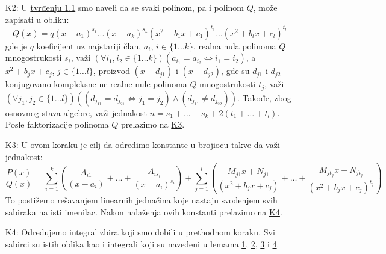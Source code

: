 \documentclass{article}
\begin{document}
\begin{algbox}
\begin{enumerate}[label=\text{K\arabic*}]
        \item[K2:]\label{Algoritam_1_K2}
              U \hyperref[tvrđenje_1.1]{tvrđenju 1.1} smo naveli da se
              svaki polinom, pa i polinom $Q$, može zapisati u obliku:
              $$Q(x) = q(x - a_1)^{s_1}...(x-a_k)^{s_k}(x^2 + b_1x + c_1)^{t_1}...(x^2 + b_lx + c_l)^{t_l}$$
              gde je $q$ koeficijent uz najstariji član,
              $a_i$, $i\in\{1\dotsc k\}$, realna nula polinoma $Q$ mnogostrukosti $s_i$, važi $(\forall i_1,i_2\in\{1\dotsc k\})(a_{i_1}=a_{i_2}\iff i_1=i_2)$,
              a $x^2+b_jx+c_j$, $j\in\{1\dotsc l\}$,
              proizvod $(x-d_{j1})$ i $(x-d_{j2})$,
              gde su $d_{j1}$ i $d_{j2}$ konjugovano kompleksne ne-realne nule polinoma $Q$
              mnogostrukosti $t_j$, važi $(\forall j_1,j_2\in\{1\dotsc l\})((d_{j_11}=d_{j_21}\iff j_1=j_2)\land(d_{j_11}\neq d_{j_22}))$.
              Takođe, zbog \hyperref[OSA]{osnovnog stava algebre}, važi jednakost $n=s_1+\dotsc+s_k+2(t_1+\dotsc+t_l)$.
              Posle faktorizacije polinoma $Q$ prelazimo na \hyperref[Algoritam_1_K3]{K3}.
        \item[K3:]\label{Algoritam_1_K3}
              U ovom koraku je cilj da odredimo konstante u brojiocu takve da važi jednakost:
              $$\frac{P(x)}{Q(x)}=\sum_{i = 1}^k(\frac{A_{i1}}{(x-a_i)}+\dotsc+\frac{A_{is_i}}{(x-a_i)^{s_i}}) + \sum_{j = 1}^l( \frac{M_{j1}x + N_{j1}}{(x^2+b_jx+c_j)}+\dotsc+\frac{M_{jt_j}x + N_{jt_j}}{(x^2 + b_jx + c_j)^{t_j}})$$
              To postižemo rešavanjem linearnih jednačina koje
              nastaju svođenjem svih sabiraka na isti imenilac.
              Nakon nalaženja ovih konstanti prelazimo na \hyperref[Algoritam_1_K4]{K4}.
        \item[K4:]\label{Algoritam_1_K4}
              Određujemo integral zbira koji smo dobili u prethodnom koraku.
              Svi sabirci su istih oblika kao i integrali koji su navedeni u lemama
              \hyperref[lema_1.1.1]{1}, \hyperref[lema_1.1.2]{2}, \hyperref[lema_1.1.3]{3} i \hyperref[lema_1.1.4]{4}.

    \end{enumerate}
\end{algbox}
\end{document}

